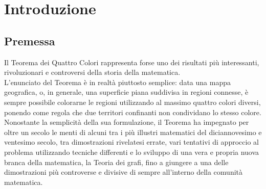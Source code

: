 \documentclass[a4paper,12pt,titlepage]{report}
\begin{document}
	
	\begin{frontespizio}
	\end{frontespizio}   
	                         
	\newpage
	\thispagestyle{empty}
	\null
	\newpage
	\setcounter{page}{1} %
	
	\tableofcontents
	 
	\newpage
	\null                       
	
	\chapter{Introduzione}                
	
	\section{Premessa}
	Il Teorema dei Quattro Colori rappresenta forse uno dei risultati più interessanti, rivoluzionari e controversi della storia della matematica.
	\\L’enunciato del Teorema è in realtà piuttosto semplice: data una mappa geografica, o, in generale, una superficie piana suddivisa in regioni connesse, è sempre possibile colorarne le regioni utilizzando al massimo quattro colori diversi, ponendo come regola che due territori confinanti non condividano lo stesso colore.
	\\Nonostante la semplicità della sua formulazione, il Teorema ha impegnato per oltre un secolo le menti di alcuni tra i più illustri matematici del diciannovesimo e ventesimo secolo, tra dimostrazioni rivelatesi errate, vari tentativi di approccio al problema utilizzando tecniche differenti e lo sviluppo di una vera e propria nuova branca della matematica, la Teoria dei grafi, fino a giungere a una delle dimostrazioni più controverse e divisive di sempre all’interno della comunità matematica.
	
\end{document}
